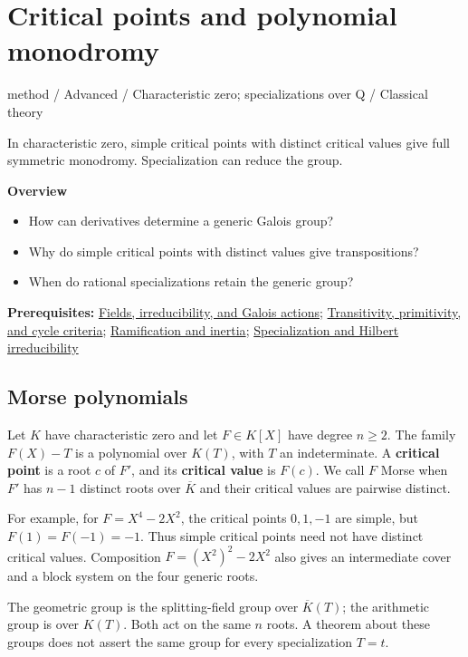 \documentclass[11pt,a4paper,oneside,openany]{book}
\begin{document}
\chapter{Critical points and polynomial monodromy}\label{article:critical-points-monodromy}\hypertarget{article:critical-points-monodromy}{}\color{black}
{\sffamily\small\color{atlasgold}method / Advanced / Characteristic zero; specializations over Q / Classical theory}\par\medskip
In characteristic zero, simple critical points with distinct critical values give full symmetric monodromy. Specialization can reduce the group.\par\medskip
\textbf{Overview}\begin{itemize}
\item How can derivatives determine a generic Galois group?
\item Why do simple critical points with distinct values give transpositions?
\item When do rational specializations retain the generic group?
\end{itemize}
{\small\textbf{Prerequisites:} \hyperlink{article:foundations}{Fields, irreducibility, and Galois actions}; \hyperlink{article:permutation-groups}{Transitivity, primitivity, and cycle criteria}; \hyperlink{article:ramification-inertia}{Ramification and inertia}; \hyperlink{article:specialization}{Specialization and Hilbert irreducibility}}\par
{}\section{Morse polynomials}
\color{black} Let \(K\) have characteristic zero and let \(F\in K[X]\) have degree \(n\ge2\). The family \(F(X)-T\) is a polynomial over \(K(T)\), with \(T\) an indeterminate. A \textbf{critical point} is a root \(c\) of \(F'\), and its \textbf{critical value} is \(F(c)\). We call \(F\) Morse when \(F'\) has \(n-1\) distinct roots over \(\overline K\) and their critical values are pairwise distinct.\par
\color{black} For example, for \(F=X^4-2X^2\), the critical points \(0,1,-1\) are simple, but \(F(1)=F(-1)=-1\). Thus simple critical points need not have distinct critical values. Composition \(F=(X^2)^2-2X^2\) also gives an intermediate cover and a block system on the four generic roots.\par
\color{black} The geometric group is the splitting-field group over \(\overline K(T)\); the arithmetic group is over \(K(T)\). Both act on the same \(n\) roots. A theorem about these groups does not assert the same group for every specialization \(T=t\).\par
\end{document}
